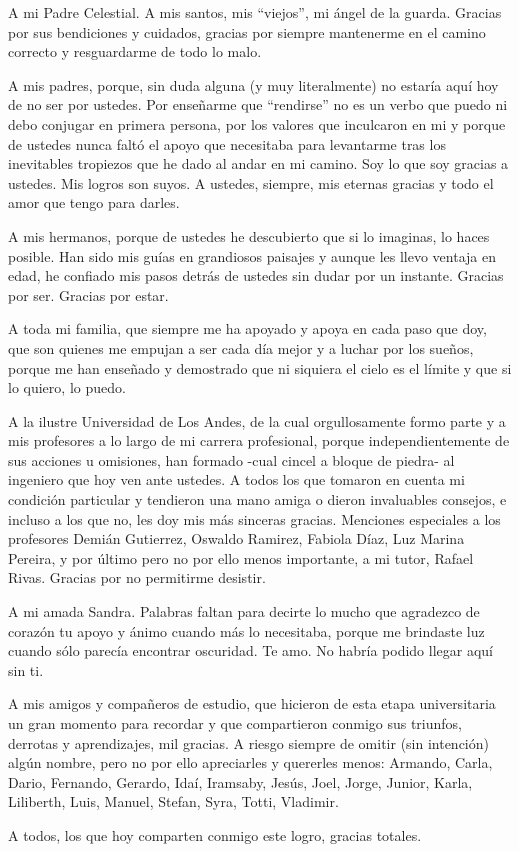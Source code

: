 A mi Padre Celestial. A mis santos, mis ``viejos'', mi ángel de la guarda. Gracias por sus bendiciones y cuidados, gracias por siempre mantenerme en el camino correcto y resguardarme de todo lo malo.
\par
A mis padres, porque, sin duda alguna (y muy literalmente) no estaría aquí hoy de no ser por ustedes. Por enseñarme que ``rendirse'' no es un verbo que puedo ni debo conjugar en primera persona, por los valores que inculcaron en mi y porque de ustedes nunca faltó el apoyo que necesitaba para levantarme tras los inevitables tropiezos que he dado al andar en mi camino. Soy lo que soy gracias a ustedes. Mis logros son suyos. A ustedes, siempre, mis eternas gracias y todo el amor que tengo para darles.
\par
A mis hermanos, porque de ustedes he descubierto que si lo imaginas, lo haces posible. Han sido mis guías en grandiosos paisajes y aunque les llevo ventaja en edad, he confiado mis pasos detrás de ustedes sin dudar por un instante. Gracias por ser. Gracias por estar.
\par
A toda mi familia, que siempre me ha apoyado y apoya en cada paso que doy, que son quienes me empujan a ser cada día mejor y a luchar por los sueños, porque me han enseñado y demostrado que ni siquiera el cielo es el límite y que si lo quiero, lo puedo.
\par
A la ilustre Universidad de Los Andes, de la cual orgullosamente formo parte y a mis profesores a lo largo de mi carrera profesional, porque independientemente de sus acciones u omisiones, han formado -cual cincel a bloque de piedra- al ingeniero que hoy ven ante ustedes. A todos los que tomaron en cuenta mi condición particular y tendieron una mano amiga o dieron invaluables consejos, e incluso a los que no, les doy mis más sinceras gracias. Menciones especiales a los profesores Demián Gutierrez, Oswaldo Ramirez, Fabiola Díaz, Luz Marina Pereira, y por último pero no por ello menos importante, a mi tutor, Rafael Rivas. Gracias por no permitirme desistir.
\par
A mi amada Sandra. Palabras faltan para decirte lo mucho que agradezco de corazón tu apoyo y ánimo cuando más lo necesitaba, porque me brindaste luz cuando sólo parecía encontrar oscuridad. Te amo. No habría podido llegar aquí sin ti.
\par
A mis amigos y compañeros de estudio, que hicieron de esta etapa universitaria un gran momento para recordar y que compartieron conmigo sus triunfos, derrotas y aprendizajes, mil gracias. A riesgo siempre de omitir (sin intención) algún nombre, pero no por ello apreciarles y quererles menos: Armando, Carla, Dario, Fernando, Gerardo, Idaí, Iramsaby, Jesús, Joel, Jorge, Junior, Karla, Liliberth, Luis, Manuel, Stefan, Syra, Totti, Vladimir.
\par
A todos, los que hoy comparten conmigo este logro, gracias totales.